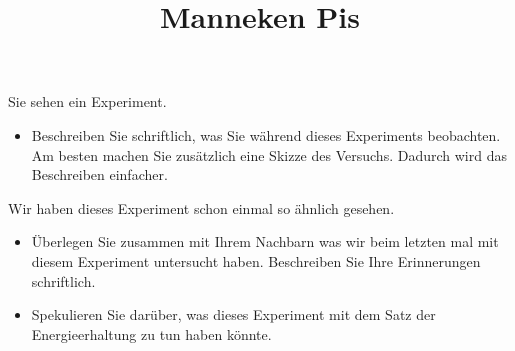 \documentclass[12pt,a5paper,twoside]{article}
\title{Manneken Pis}
\date{}
\begin{document}
\maketitle

Sie sehen ein Experiment.
\begin{itemize}
	\item Beschreiben Sie schriftlich, was Sie während dieses Experiments beobachten.
		Am besten machen Sie zusätzlich eine Skizze des Versuchs. Dadurch wird das Beschreiben einfacher.
\end{itemize}

Wir haben dieses Experiment schon einmal so ähnlich gesehen.
\begin{itemize}
	\item Überlegen Sie zusammen mit Ihrem Nachbarn was wir beim letzten mal mit diesem Experiment untersucht haben.
		Beschreiben Sie Ihre Erinnerungen schriftlich.
	\item Spekulieren Sie darüber, was dieses Experiment mit dem Satz der Energieerhaltung zu tun haben könnte.
\end{itemize}
\end{document}
